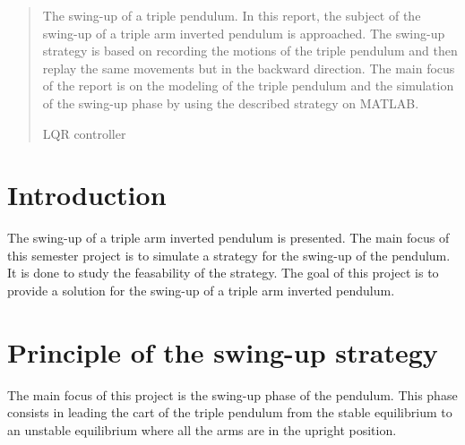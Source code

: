 \documentclass[a4paper,12pt,twoside]{article}
\begin{document}
\renewcommand{\headheight}{14.5pt}
\renewcommand{\tablename}{Table}
\renewcommand{\figurename}{Figure}


\newpage
\tableofcontents
\newpage


\begin{abstract}
The swing-up of a triple pendulum.
In this report, the subject of the swing-up of a triple arm inverted pendulum is approached. The swing-up strategy is based on recording the motions of the triple pendulum and then replay the same movements but in the backward direction. The main focus of the report is on the modeling of the triple pendulum and the simulation of the swing-up phase by using the described strategy on MATLAB.

LQR controller
\end{abstract}

\section{Introduction}\label{sec:intro} %
The swing-up of a triple arm inverted pendulum is presented. The main focus of this semester project is to simulate a strategy for the swing-up of the pendulum. It is done to study the feasability of the strategy.
The goal of this project is to provide a solution for the swing-up of a triple arm inverted pendulum.

\section{Principle of the swing-up strategy}
The main focus of this project is the swing-up phase of the pendulum. This phase consists in leading the cart of the triple pendulum from the stable equilibrium to an unstable equilibrium where all the arms are in the upright position.

\end{document}
